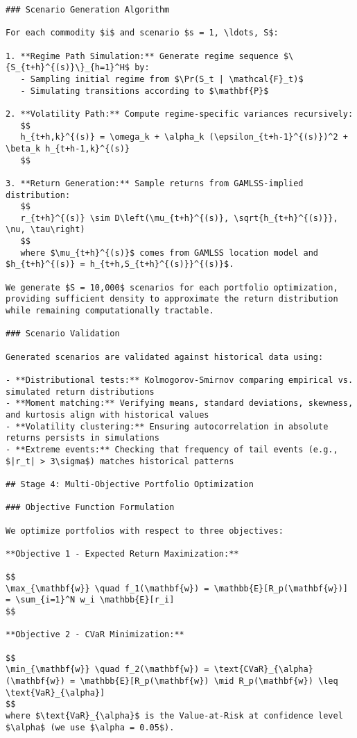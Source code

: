 \documentclass[
  10pt,
  a4paper,
]{article}
\begin{document}
\begin{tcolorbox}
\begin{verbatim}
### Scenario Generation Algorithm

For each commodity $i$ and scenario $s = 1, \ldots, S$:

1. **Regime Path Simulation:** Generate regime sequence $\{S_{t+h}^{(s)}\}_{h=1}^H$ by:
   - Sampling initial regime from $\Pr(S_t | \mathcal{F}_t)$
   - Simulating transitions according to $\mathbf{P}$

2. **Volatility Path:** Compute regime-specific variances recursively:
   $$
   h_{t+h,k}^{(s)} = \omega_k + \alpha_k (\epsilon_{t+h-1}^{(s)})^2 + \beta_k h_{t+h-1,k}^{(s)}
   $$

3. **Return Generation:** Sample returns from GAMLSS-implied distribution:
   $$
   r_{t+h}^{(s)} \sim D\left(\mu_{t+h}^{(s)}, \sqrt{h_{t+h}^{(s)}}, \nu, \tau\right)
   $$
   where $\mu_{t+h}^{(s)}$ comes from GAMLSS location model and $h_{t+h}^{(s)} = h_{t+h,S_{t+h}^{(s)}}^{(s)}$.

We generate $S = 10,000$ scenarios for each portfolio optimization, providing sufficient density to approximate the return distribution while remaining computationally tractable.

### Scenario Validation

Generated scenarios are validated against historical data using:

- **Distributional tests:** Kolmogorov-Smirnov comparing empirical vs. simulated return distributions
- **Moment matching:** Verifying means, standard deviations, skewness, and kurtosis align with historical values
- **Volatility clustering:** Ensuring autocorrelation in absolute returns persists in simulations
- **Extreme events:** Checking that frequency of tail events (e.g., $|r_t| > 3\sigma$) matches historical patterns

## Stage 4: Multi-Objective Portfolio Optimization

### Objective Function Formulation

We optimize portfolios with respect to three objectives:

**Objective 1 - Expected Return Maximization:**

$$
\max_{\mathbf{w}} \quad f_1(\mathbf{w}) = \mathbb{E}[R_p(\mathbf{w})] = \sum_{i=1}^N w_i \mathbb{E}[r_i]
$$

**Objective 2 - CVaR Minimization:**

$$
\min_{\mathbf{w}} \quad f_2(\mathbf{w}) = \text{CVaR}_{\alpha}(\mathbf{w}) = \mathbb{E}[R_p(\mathbf{w}) \mid R_p(\mathbf{w}) \leq \text{VaR}_{\alpha}]
$$
where $\text{VaR}_{\alpha}$ is the Value-at-Risk at confidence level $\alpha$ (we use $\alpha = 0.05$).


\end{verbatim}
\end{tcolorbox}
\end{document}
